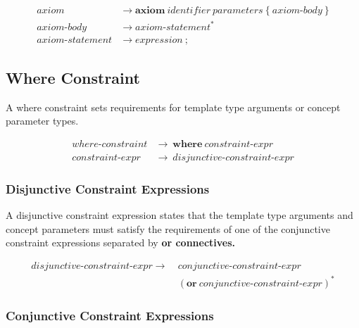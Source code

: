 \documentclass[a4paper,oneside,11pt]{article}
\begin{document}
\begin{align*}
axiom &\rightarrow \textbf{axiom} \> \hyperref[identifier]{identifier} \> \hyperref[parameters]{parameters} \> \texttt{\{} \> axiom\textrm{-}body \> \texttt{\}}\\
axiom\textrm{-}body &\rightarrow axiom\textrm{-}statement^*\\
axiom\textrm{-}statement &\rightarrow \hyperref[expression]{expression} \> \texttt{;}
\end{align*}

\subsection{Where Constraint}\label{sec:where-constraint}\label{whereconstraint}\label{constraintexpr}

A where constraint sets requirements for template type arguments or concept parameter types.

\begin{align*}
where\textrm{-}constraint &\rightarrow \> \textbf{where} \> constraint\textrm{-}expr\\
constraint\textrm{-}expr  &\rightarrow \> \hyperref[disjunctiveconstraint]{disjunctive\textrm{-}constraint\textrm{-}expr}
\end{align*}

\subsubsection{Disjunctive Constraint Expressions}\label{disjunctiveconstraint}

A disjunctive constraint expression states that the template type arguments and concept parameters must satisfy
the requirements of one of the conjunctive constraint expressions separated by \bf{or} connectives.

\begin{align*}
disjunctive\textrm{-}constraint\textrm{-}expr \rightarrow \> &\hyperref[conjunctiveconstraint]{conjunctive\textrm{-}constraint\textrm{-}expr}\\
&(\textbf{or} \> \hyperref[conjunctiveconstraint]{conjunctive\textrm{-}constraint\textrm{-}expr})^*
\end{align*}

\subsubsection{Conjunctive Constraint Expressions}\label{conjunctiveconstraint}
\end{document}
